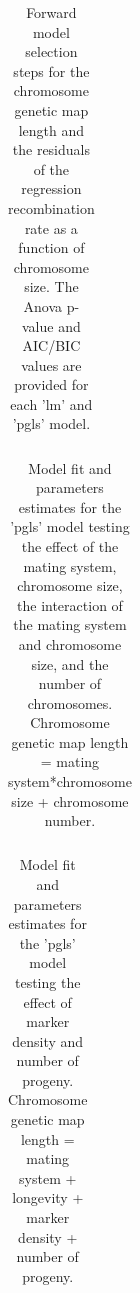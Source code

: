 \documentclass{article}
\begin{document}
\begin{table}[h!]
\centering{}
\caption{Forward model selection steps for the chromosome genetic map length and the residuals of the regression recombination rate as a function of chromosome size. The Anova p-value and AIC/BIC values are provided for each 'lm' and 'pgls' model.}
\begin{tabular}{cccccccc}
\end{tabular}
\label{table:tableS2}
\end{table}



\begin{table}[h!]
\centering{}
\caption{Model fit and parameters estimates for the 'pgls' model testing the effect of the mating system, chromosome size, the interaction of the mating system and chromosome size, and the number of chromosomes. Chromosome genetic map length = mating system*chromosome size + chromosome number.}
\begin{tabular}{cccccccc}
\end{tabular}
\label{table:tableS3}
\end{table}


\begin{table}[h!]
\centering{}
\caption{Model fit and parameters estimates for the 'pgls' model testing the effect of marker density and number of progeny. Chromosome genetic map length = mating system + longevity + marker density + number of progeny.}
\begin{tabular}{cccccccc}
\end{tabular}
\label{table:tableS4}
\end{table}
\end{document}
